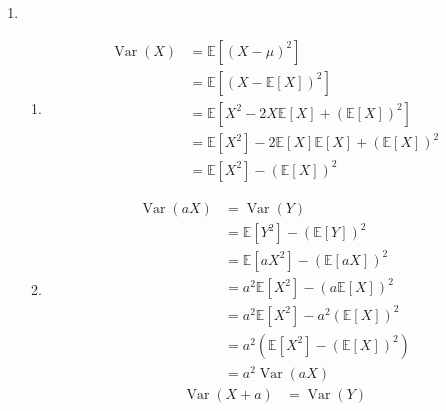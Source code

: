 \documentclass[pdftex,12pt,a4paper]{article}
\begin{document}
\begin{enumerate}
\begin{align}
            \end{align}
        (*new)
            $$\mathbb{P}\left(\bigcup_i^n(\overline{E_i})\right) + n\geq 1$$
        (n=1)
            $$\mathbb{P}(\overline{E_1}) + 1 \geq 0$$
            $$\mathbb{P}(\forall \chi) \in [0,1]$$
            $$\textit{so \ding{51}}$$
        (n)
            $$\mathbb{P}\left(\bigcup_i^n(\overline{E_i})\right) + n\geq 1 $$
            $$\textit{Since}$$
            $$\mathbb{P}(\forall \chi) \in [0,1]$$
            $$n \in {N}$$
            $$ \textit{so \ding{51}}$$
        (*new) holds and so does (*)
    \item
        \begin{enumerate}
            \item
                \begin{align}
                    \operatorname{Var}(X) &= \mathbb{E}[(X - \mu)^2] \\
                                          &= \mathbb{E}[(X - \mathbb{E}[X])^2] \\
                                          &= \mathbb{E}[X^2 - 2X\mathbb{E}[X] + (\mathbb{E}[X])^2] \\
                                          &= \mathbb{E}[X^2] - 2\mathbb{E}[X]\mathbb{E}[X] + (\mathbb{E}[X])^2 \\
                                          &= \mathbb{E}[X^2 ] - (\mathbb{E}[X])^2
                \end{align}
            \item
                \begin{align}
                    \operatorname{Var}(aX) &= \operatorname{Var}(Y)\\
                                           &= \mathbb{E}[Y^2] - (\mathbb{E}[Y])^2\\
                                           &= \mathbb{E}[aX^2] - (\mathbb{E}[aX])^2\\
                                           &= a^2\mathbb{E}[X^2] - (a\mathbb{E}[X])^2\\
                                           &= a^2\mathbb{E}[X^2] - a^2(\mathbb{E}[X])^2\\
                                           &= a^2(\mathbb{E}[X^2] - (\mathbb{E}[X])^2)\\
                                           &= a^2\operatorname{Var}(aX)
                \end{align}
                \begin{align}
                    \operatorname{Var}(X + a) &= \operatorname{Var}(Y)\\

\end{align}
\end{enumerate}
\end{enumerate}
\end{document}
